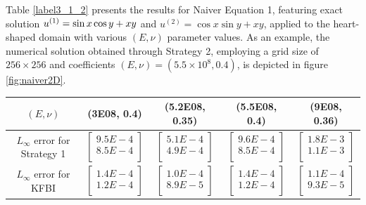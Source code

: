 \documentclass{article}
\begin{document}
Table \ref{label3_1_2} presents the results for Naiver Equation 1, featuring exact solution $u^{(1)} = \sin x \cos y \\ + xy$ and $u^{(2)} = \cos x \sin y + xy$, applied to the heart-shaped domain with various $(E, \nu)$ parameter values. As an example, the numerical solution obtained through Strategy 2, employing a grid size of $256 \times 256$ and coefficients $(E, \nu) = (5.5\times 10^8, 0.4)$, is depicted in figure \ref{fig:naiver2D}.
\begin{table}[ht]
    \centering
    \begin{tabular}{|c|c|c|c|c|} \hline 
         $(E, \nu) $ & (3E08, 0.4) & (5.2E08, 0.35) & (5.5E08, 0.4) & (9E08, 0.36) \\ \hline 
         $L_{\infty}$ error for Strategy 1 & $\begin{bmatrix}  9.5E-4\\ 8.5E-4\\ \end{bmatrix}$  
         & $\begin{bmatrix}  5.1E-4\\ 4.9E-4\\ \end{bmatrix}$ 
         & $\begin{bmatrix}  9.6E-4\\ 8.5E-4\\ \end{bmatrix}$ 
         & $\begin{bmatrix}  1.8E-3\\ 1.1E-3\\ \end{bmatrix}$  \\ \hline
         $L_{\infty}$ error for KFBI & $\begin{bmatrix}  1.4E-4\\ 1.2E-4\\ \end{bmatrix}$ 
         & $\begin{bmatrix}  1.0E-4\\ 8.9E-5\\ \end{bmatrix}$ 
         & $\begin{bmatrix}  1.4E-4\\ 1.2E-4\\ \end{bmatrix}$ 
         & $\begin{bmatrix}  1.1E-4\\ 9.3E-5\\ \end{bmatrix}$  \\ \hline

\end{tabular}
\end{table}
\end{document}
